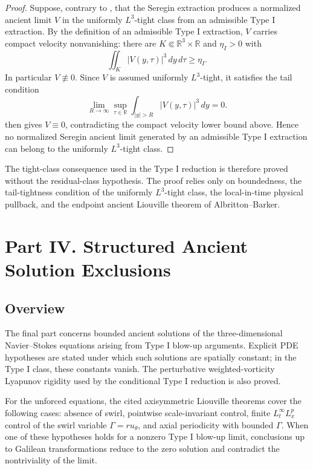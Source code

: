\documentclass[11pt]{amsart}
\theoremstyle{plain}
\theoremstyle{definition}
\theoremstyle{remark}
\numberwithin{equation}{section}
\newcommand{\R}{\mathbb R}
\begin{document}
\begin{proof}
Suppose, contrary to , that the Seregin
extraction produces a normalized ancient limit \(V\) in
the uniformly \(L^3\)-tight class from an admissible Type I extraction.  By the
definition of an admissible Type I extraction, \(V\) carries compact velocity
nonvanishing:
there are \(K\Subset\mathbb R^3\times\mathbb R\) and \(\eta_I>0\) with
\[
   \iint_K |V(y,\tau)|^3\,dy\,d\tau\ge\eta_I .
\]
In particular \(V\not\equiv0\).  Since \(V\) is assumed uniformly
\(L^3\)-tight, it satisfies the tail condition
\[
   \lim_{R\to\infty}
   \sup_{\tau\in\R}\int_{|y|>R}|V(y,\tau)|^3\,dy=0 .
\]
 then gives \(V\equiv0\), contradicting the compact
velocity lower bound above.  Hence no normalized Seregin ancient limit
generated by an admissible Type I extraction can belong to the uniformly
\(L^3\)-tight class.
\end{proof}

The tight-class consequence used in the Type I reduction is therefore proved
without the residual-class hypothesis.  The proof relies only on boundedness, the
tail-tightness condition of the uniformly \(L^3\)-tight class, the
local-in-time physical pullback, and the endpoint ancient Liouville theorem of
Albritton--Barker.



\clearpage
\section*{Part IV. Structured Ancient Solution Exclusions}

\subsection*{Overview}

The final part concerns bounded ancient solutions of the three-dimensional
Navier--Stokes equations arising from Type I blow-up arguments.  Explicit PDE
hypotheses are stated under which such solutions are spatially constant; in the
Type I class, these constants vanish.  The perturbative weighted-vorticity
Lyapunov rigidity used by the conditional Type I reduction is also proved.

For the unforced equations, the cited axisymmetric Liouville theorems cover the
following cases: absence of swirl, pointwise scale-invariant control, finite
\(L_t^\infty L_x^p\) control of the swirl variable \(\Gamma=ru_\theta\), and
axial periodicity with bounded \(\Gamma\).  When one of these hypotheses holds
for a nonzero Type I blow-up limit, conclusions up to Galilean transformations
reduce to the zero solution and contradict the nontriviality of the limit.
\end{document}

